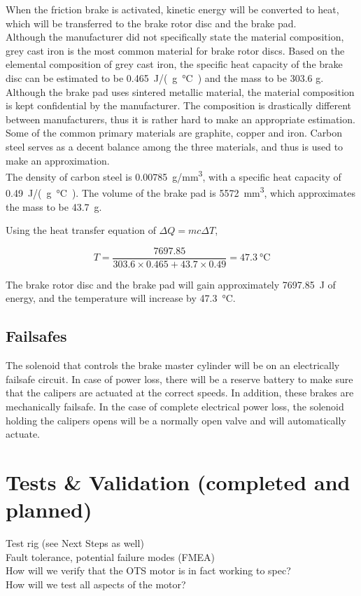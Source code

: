 \documentclass[main.tex]{subfiles}
\begin{document}
    When the friction brake is activated, kinetic energy will be converted to heat, which will be transferred to the brake rotor disc and the brake pad.\\
    
    Although the manufacturer did not specifically state the material composition, grey cast iron is the most common material for brake rotor discs. Based on the elemental composition of grey cast iron, the specific heat capacity of the brake disc can be estimated to be \SI{0.465}{J/(g\celsius)} and the mass to be 303.6 g.\\
    
    Although the brake pad uses sintered metallic material, the material composition is kept confidential by the manufacturer. The composition is drastically different between manufacturers, thus it is rather hard to make an appropriate estimation. Some of the common primary materials are graphite, copper and iron. Carbon steel serves as a decent balance among the three materials, and thus is used to make an approximation.\\

    The density of carbon steel is \SI{0.00785}{g/mm^3}, with a specific heat capacity of \SI{0.49}{J/(g\celsius)}. The volume of the brake pad is \SI{5572}{mm^3}, which approximates the mass to be \SI{43.7}{g}.

    Using the heat transfer equation of $\Delta Q = mc \Delta T$,
   	
    \begin{equation}
    	T=\frac{7697.85}{303.6 \times 0.465+43.7 \times 0.49}=\SI{47.3}{\celsius}
    \end{equation}
   
    The brake rotor disc and the brake pad will gain approximately \SI{7697.85}{J} of energy, and the temperature will increase by \SI{47.3}{\celsius}.\\

    \subsection{Failsafes}
    The solenoid that controls the brake master cylinder will be on an electrically failsafe circuit. In case of power loss, there will be a reserve battery to make sure that the calipers are actuated at the correct speeds. In addition, these brakes are mechanically failsafe. In the case of complete electrical power loss, the solenoid holding the calipers opens will be a normally open valve and will automatically actuate.

    \section{Tests \& Validation (completed and planned)}
    Test rig (see Next Steps as well)\\
    Fault tolerance, potential failure modes (FMEA)\\
    How will we verify that the OTS motor is in fact working to spec?\\
    How will we test all aspects of the motor?
\end{document}
